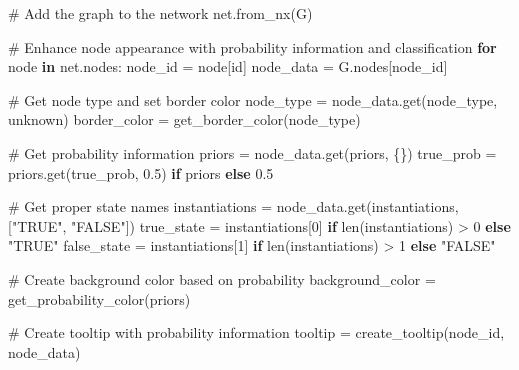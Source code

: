 \documentclass[
  11pt,
  letterpaper,
]{book}
\newenvironment{Shaded}{\begin{snugshade}}{\end{snugshade}}
\newcommand{\BuiltInTok}[1]{\textcolor[rgb]{0.00,0.23,0.31}{#1}}
\newcommand{\CommentTok}[1]{\textcolor[rgb]{0.37,0.37,0.37}{#1}}
\newcommand{\ControlFlowTok}[1]{\textcolor[rgb]{0.00,0.23,0.31}{\textbf{#1}}}
\newcommand{\DecValTok}[1]{\textcolor[rgb]{0.68,0.00,0.00}{#1}}
\newcommand{\FloatTok}[1]{\textcolor[rgb]{0.68,0.00,0.00}{#1}}
\newcommand{\KeywordTok}[1]{\textcolor[rgb]{0.00,0.23,0.31}{\textbf{#1}}}
\newcommand{\NormalTok}[1]{\textcolor[rgb]{0.00,0.23,0.31}{#1}}
\newcommand{\OperatorTok}[1]{\textcolor[rgb]{0.37,0.37,0.37}{#1}}
\newcommand{\StringTok}[1]{\textcolor[rgb]{0.13,0.47,0.30}{#1}}
\begin{document}
\begin{landscape}
\begin{Shaded}
\begin{Highlighting}[]
    \CommentTok{\# Add the graph to the network}
\NormalTok{    net.from\_nx(G)}

    \CommentTok{\# Enhance node appearance with probability information and classification}
    \ControlFlowTok{for}\NormalTok{ node }\KeywordTok{in}\NormalTok{ net.nodes:}
\NormalTok{        node\_id }\OperatorTok{=}\NormalTok{ node[}\StringTok{\textquotesingle{}id\textquotesingle{}}\NormalTok{]}
\NormalTok{        node\_data }\OperatorTok{=}\NormalTok{ G.nodes[node\_id]}

        \CommentTok{\# Get node type and set border color}
\NormalTok{        node\_type }\OperatorTok{=}\NormalTok{ node\_data.get(}\StringTok{\textquotesingle{}node\_type\textquotesingle{}}\NormalTok{, }\StringTok{\textquotesingle{}unknown\textquotesingle{}}\NormalTok{)}
\NormalTok{        border\_color }\OperatorTok{=}\NormalTok{ get\_border\_color(node\_type)}

        \CommentTok{\# Get probability information}
\NormalTok{        priors }\OperatorTok{=}\NormalTok{ node\_data.get(}\StringTok{\textquotesingle{}priors\textquotesingle{}}\NormalTok{, \{\})}
\NormalTok{        true\_prob }\OperatorTok{=}\NormalTok{ priors.get(}\StringTok{\textquotesingle{}true\_prob\textquotesingle{}}\NormalTok{, }\FloatTok{0.5}\NormalTok{) }\ControlFlowTok{if}\NormalTok{ priors }\ControlFlowTok{else} \FloatTok{0.5}

        \CommentTok{\# Get proper state names}
\NormalTok{        instantiations }\OperatorTok{=}\NormalTok{ node\_data.get(}\StringTok{\textquotesingle{}instantiations\textquotesingle{}}\NormalTok{, [}\StringTok{"TRUE"}\NormalTok{, }\StringTok{"FALSE"}\NormalTok{])}
\NormalTok{        true\_state }\OperatorTok{=}\NormalTok{ instantiations[}\DecValTok{0}\NormalTok{] }\ControlFlowTok{if} \BuiltInTok{len}\NormalTok{(instantiations) }\OperatorTok{\textgreater{}} \DecValTok{0} \ControlFlowTok{else} \StringTok{"TRUE"}
\NormalTok{        false\_state }\OperatorTok{=}\NormalTok{ instantiations[}\DecValTok{1}\NormalTok{] }\ControlFlowTok{if} \BuiltInTok{len}\NormalTok{(instantiations) }\OperatorTok{\textgreater{}} \DecValTok{1} \ControlFlowTok{else} \StringTok{"FALSE"}

        \CommentTok{\# Create background color based on probability}
\NormalTok{        background\_color }\OperatorTok{=}\NormalTok{ get\_probability\_color(priors)}

        \CommentTok{\# Create tooltip with probability information}
\NormalTok{        tooltip }\OperatorTok{=}\NormalTok{ create\_tooltip(node\_id, node\_data)}


\end{Highlighting}
\end{Shaded}
\end{landscape}
\end{document}

